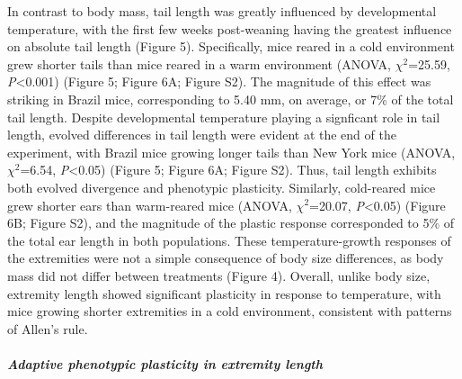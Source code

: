 \documentclass[]{article}
\let\oldsubparagraph\subparagraph
\renewcommand{\subparagraph}[1]{\oldsubparagraph{#1}\mbox{}}
\begin{document}
In contrast to body mass, tail length was greatly influenced by
developmental temperature, with the first few weeks post-weaning having
the greatest influence on absolute tail length (Figure 5). Specifically,
mice reared in a cold environment grew shorter tails than mice reared in
a warm environment (ANOVA, \(\chi^2\)=25.59, \emph{P}\textless{}0.001)
(Figure 5; Figure 6A; Figure S2). The magnitude of this effect was
striking in Brazil mice, corresponding to 5.40 mm, on average, or 7\% of
the total tail length. Despite developmental temperature playing a
signficant role in tail length, evolved differences in tail length were
evident at the end of the experiment, with Brazil mice growing longer
tails than New York mice (ANOVA, \(\chi^2\)=6.54,
\emph{P}\textless{}0.05) (Figure 5; Figure 6A; Figure S2). Thus, tail
length exhibits both evolved divergence and phenotypic plasticity.
Similarly, cold-reared mice grew shorter ears than warm-reared mice
(ANOVA, \(\chi^2\)=20.07, \emph{P}\textless{}0.05) (Figure 6B; Figure
S2), and the magnitude of the plastic response corresponded to 5\% of
the total ear length in both populations. These temperature-growth
responses of the extremities were not a simple consequence of body size
differences, as body mass did not differ between treatments (Figure 4).
Overall, unlike body size, extremity length showed significant
plasticity in response to temperature, with mice growing shorter
extremities in a cold environment, consistent with patterns of Allen's
rule.

\vspace{2.5mm}

\hypertarget{adaptive-phenotypic-plasticity-in-extremity-length}{%
\subparagraph{\texorpdfstring{\emph{Adaptive phenotypic plasticity in
extremity
length}}{Adaptive phenotypic plasticity in extremity length}}\label{adaptive-phenotypic-plasticity-in-extremity-length}}
\end{document}
